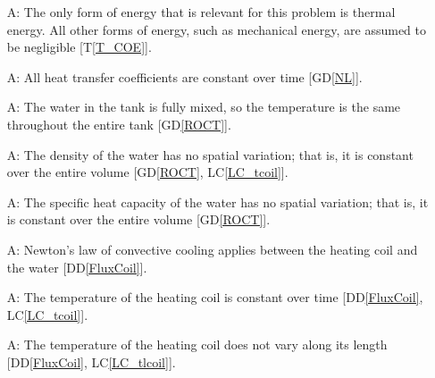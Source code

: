 \documentclass[12pt]{article}
\newcommand{\dref}[1]{GD\ref{#1}}
\newcommand{\ddref}[1]{DD\ref{#1}}
\newcommand{\tref}[1]{T\ref{#1}}
\newcounter{assumpnum} %
\newcommand{\lcref}[1]{LC\ref{#1}}
\begin{document}
\begin{itemize}

\item[A\refstepcounter{assumpnum}\theassumpnum \label{A_OnlyThermalEnergy}:] The
  only form of energy that is relevant for this problem is thermal energy.  All
  other forms of energy, such as mechanical energy, are assumed to be
  negligible [\tref{T_COE}].

\item[A\refstepcounter{assumpnum}\theassumpnum \label{A_hcoeff}:] All heat
  transfer coefficients are constant over time [\dref{NL}].

\item[A\refstepcounter{assumpnum}\theassumpnum \label{A_mixed}:] The water in
  the tank is fully mixed, so the temperature is the same throughout the entire
  tank [\dref{ROCT}].%


\item[A\refstepcounter{assumpnum}\theassumpnum \label{A_const_density}:] The density
  of the water
has no spatial variation; that is, it is
  constant over the entire volume [\dref{ROCT}, \lcref{LC_tcoil}].

\item[A\refstepcounter{assumpnum}\theassumpnum \label{A_const_C}:] The specific heat
  capacity of the water 
has no spatial variation; that is, it is
 constant over the entire volume [\dref{ROCT}].

\item[A\refstepcounter{assumpnum}\theassumpnum \label{A_Newt_coil}:] Newton's
  law of convective cooling applies between the heating coil and the water [\ddref{FluxCoil}].
	
\item[A\refstepcounter{assumpnum}\theassumpnum \label{A_tcoil}:] The temperature
  of the heating coil is constant over time [\ddref{FluxCoil}, \lcref{LC_tcoil}].
	
\item[A\refstepcounter{assumpnum}\theassumpnum \label{A_tlcoil}:] The
  temperature of the heating coil does not vary along its
  length [\ddref{FluxCoil}, \lcref{LC_tlcoil}].



\end{itemize}
\end{document}
